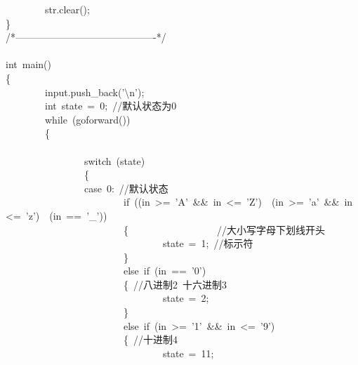 \documentclass{article}
\begin{document}
\begin{mdpre}
~~~~~~~~str.clear();\\
\}\\
{/*}{-------------------------------------------}{*/}\\
\\
{int}~main()\\
\{\\
~~~~~~~~input.push\_back({'}{\textbackslash{}n}{'});\\
~~~~~~~~{int}~state~=~{0};~{//默认状态为0}\\
~~~~~~~~{while}~(goforward())\\
~~~~~~~~\{\\
\\
~~~~~~~~~~~~~~~~{switch}~(state)\\
~~~~~~~~~~~~~~~~\{\\
~~~~~~~~~~~~~~~~{case}~{0}:~{//默认状态}\\
~~~~~~~~~~~~~~~~~~~~~~~~{if}~((in~\textgreater{}=~{'A'}~\&\&~in~\textless{}=~{'Z'})~\textbar{}\textbar{}~(in~\textgreater{}=~{'a'}~\&\&~in~\textless{}=~{'z'})~\textbar{}\textbar{}~(in~==~{'\_'}))\\
~~~~~~~~~~~~~~~~~~~~~~~~\{~~~~~~~~~~~~~~~~~~{//大小写字母下划线开头}\\
~~~~~~~~~~~~~~~~~~~~~~~~~~~~~~~~state~=~{1};~{//标示符}\\
~~~~~~~~~~~~~~~~~~~~~~~~\}\\
~~~~~~~~~~~~~~~~~~~~~~~~{else}~{if}~(in~==~{'0'})\\
~~~~~~~~~~~~~~~~~~~~~~~~\{~{//八进制2~十六进制3}\\
~~~~~~~~~~~~~~~~~~~~~~~~~~~~~~~~state~=~{2};\\
~~~~~~~~~~~~~~~~~~~~~~~~\}\\
~~~~~~~~~~~~~~~~~~~~~~~~{else}~{if}~(in~\textgreater{}=~{'1'}~\&\&~in~\textless{}=~{'9'})\\
~~~~~~~~~~~~~~~~~~~~~~~~\{~{//十进制4}\\
~~~~~~~~~~~~~~~~~~~~~~~~~~~~~~~~state~=~{11};\\

\end{mdpre}
\end{document}
